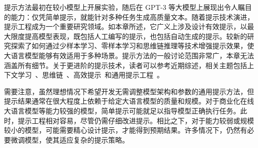提示方法最初在较小模型上开展实验，随后在 GPT-3 等大模型上展现出令人瞩目的能力：仅凭简单提示，就能针对多种任务生成高质量文本。随着提示技术演进，提示工程成为一个重要研究领域。如本章所述，它广义上涉及设计有效提示，以最大限度提高模型表现，既包括人工编写的提示，也包括自动生成的提示。较新的研究探索了如何通过少样本学习、零样本学习和思维链推理等技术增强提示效果，使大语言模型能够有效适用于多种场景。提示方法的一般讨论范围非常广，本章无法涵盖所有细节。关于更进阶的提示技术，读者可以参考近期综述，相关主题包括上下文学习~\cite{li:2023practical,dong-etal:2022survey}、思维链~\cite{chu-etal:2023survey,yu-etal:2023towards,zhang-etal:2023igniting}、高效提示~\cite{chang-etal:2024efficient}和通用提示工程~\cite{liu2023-etal:prompting,chen-etal:2023unleashing}。

需要注意，虽然理想情况下希望开发无需调整模型架构和参数的通用提示方法，但提示结果通常在很大程度上依赖于给定大语言模型的质量和规模。对于商业化在线大语言模型等能力较强的模型，简单提示可能就足以指导模型正确执行任务。此时，提示工程相对容易，尽管仍需仔细改进提示。相比之下，对于能力较弱或规模较小的模型，可能需要精心设计提示，才能得到预期结果。许多情况下，仍然有必要微调模型，使其适应复杂的提示策略。

